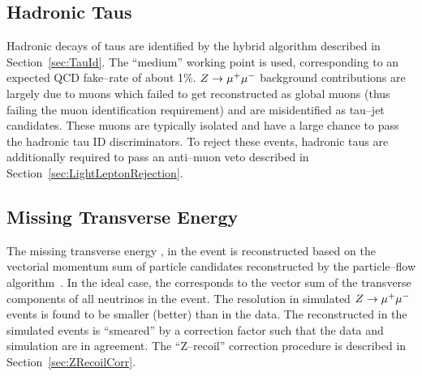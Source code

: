 \subsection{Hadronic Taus}

Hadronic decays of taus are identified by the \hpsTanc hybrid algorithm
described in Section~\ref{sec:TauId}.  The ``medium'' working point is used,
corresponding to an expected QCD fake--rate of about 1\%. $Z \to \mu^+\mu^-$ background
contributions are largely due to muons which failed to get reconstructed as
global muons (thus failing the muon identification requirement) and are
misidentified as tau--jet candidates.  These muons are typically isolated and
have a large chance to pass the hadronic tau ID discriminators.  To reject these
events, hadronic taus are additionally required to pass an anti--muon veto
described in Section~\ref{sec:LightLeptonRejection}. 

\subsection{Missing Transverse Energy}

The missing transverse energy \MET, in the event is reconstructed based on the
vectorial momentum sum of particle candidates reconstructed by the
particle--flow algorithm~\cite{CMS-PAS-PFT-09-001, CMS-PAS-JME-10-005}.  In the
ideal case, the \MET corresponds to the vector sum of the transverse components
of all neutrinos in the event.  The \MET resolution in simulated $Z\to\mu^+\mu^-$
events is found to be smaller (better) than in the data.   The reconstructed
\MET in the simulated events is ``smeared'' by a correction factor such that the
data and simulation are in agreement.  The ``Z--recoil'' \MET correction
procedure is described in Section~\ref{sec:ZRecoilCorr}.

